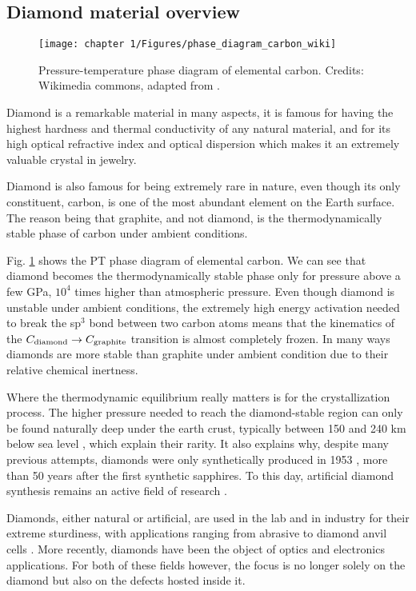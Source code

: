\documentclass[a4paper,11pt]{report}
\begin{document}
\begin{refsection}
\subsection{Diamond material overview}
\begin{figure}[h!]
\centering
\texttt{[image: chapter 1/Figures/phase\_diagram\_carbon\_wiki]}
\caption{Pressure-temperature phase diagram of elemental carbon. Credits: Wikimedia commons, adapted from \citep{bundy1989pressure, bundy1996pressure}.}
\label{carbon phase diagram}
\end{figure}

Diamond is a remarkable material in many aspects, it is famous for having the highest hardness and thermal conductivity of any natural material, and for its high optical refractive index and optical dispersion which makes it an extremely valuable crystal in jewelry.

Diamond is also famous for being extremely rare in nature, even though its only constituent, carbon, is one of the most abundant element on the Earth surface. The reason being that graphite, and not diamond, is the thermodynamically stable phase of carbon under ambient conditions.

Fig. \ref{carbon phase diagram} shows the PT phase diagram of elemental carbon. We can see that diamond becomes the thermodynamically stable phase only for pressure above a few GPa, $10^4$ times higher than atmospheric pressure. Even though diamond is unstable under ambient conditions, the extremely high energy activation needed to break the sp$^3$ bond between two carbon atoms means that the kinematics of the $C_{\rm diamond} \to C_{\rm graphite}$ transition is almost completely frozen. In many ways diamonds are more stable than graphite under ambient condition due to their relative chemical inertness.

Where the thermodynamic equilibrium really matters is for the crystallization process. The higher pressure needed to reach the diamond-stable region can only be found naturally deep under the earth crust, typically between 150 and 240 km below sea level \citep{tappert2011diamonds}, which explain their rarity. It also explains why, despite many previous attempts, diamonds were only synthetically produced in 1953 \citep{barnard2000diamond}, more than 50 years after the first synthetic sapphires. To this day, artificial diamond synthesis remains an active field of research \citep{shenderova2019synthesis, achard2020chemical}.

Diamonds, either natural or artificial, are used in the lab and in industry for their extreme sturdiness, with applications ranging from abrasive to diamond anvil cells \citep{jayaraman1983diamond}. More recently, diamonds have been the object of optics and electronics applications. For both of these fields however, the focus is no longer solely on the diamond but also on the defects hosted inside it.


\end{refsection}
\end{document}
